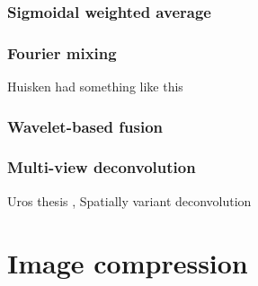     \subsubsection{Sigmoidal weighted average}
    \subsubsection{Fourier mixing}
    Huisken had something like this
    \subsubsection{Wavelet-based fusion}
    \subsubsection{Multi-view deconvolution}
    
    \cite{krzic_multiple-view_2009} Uros thesis
    \cite{temerinac-ott_multiview_2012}, \cite{temerinac-ott_spatially-variant_2011} Spatially variant deconvolution



\section{Image compression}


